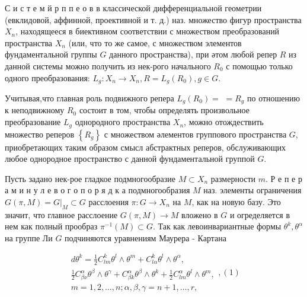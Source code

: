 \documentclass[10pt]{article}
\begin{document}
С и с т е м й р п п е о в в классической дифференциальной геометрии (евклидовой, аффинной, проективной и т. д.) наз. множество фигур пространства $X_{n}$, находящееся в биективном соответствии с множеством преобразований пространства $X_{n}$ (или, что то же самое, с множеством элементов фундаментальной группы $G$ данного пространства), при әтом любой репер $R$ из данной системы можно получить из нек-рого начального $R_{0}$ с помощью только одного преобразования: $L_{g}: X_{n} \rightarrow X_{n}, R=L_{g}\left(R_{0}\right), g \in G$.



Учитывая,что главная роль подвижного репера $L_{g}\left(R_{0}\right)=$ $=R_{g}$ по отношению к неподвижному $R_{0}$ состоит в том, чтобы определять произвольное преобразование $L_{g}$ однородного пространства $X_{n}$, можно отождествить множество реперов $\left\{R_{g}\right\}$ с множеством әлементов группового пространства $G$, приобретающих таким образом смысл абстрактных реперов, обслуживающих любое однородное пространство с данной фундаментальной группой $G$.



Пусть задано нек-рое гладкое подмногообразие $M \subset X_{n}$ размерности $m$. Р е п е р а м и н у л е в о г о п о р я д к а подмногообразия $M$ наз. элементы ограничения $G(\pi, M)=\left.G\right|_{M} \subset G$ расслоения $\pi: G \rightarrow X_{n}$ на $M$, как на новую базу. Это значит, что главное расслоение $G(\pi, M) \rightarrow M$ вложено в $G$ и огределяется в нем как полный прообраз $\pi^{-1}(M) \subset G$. Так как левоинвариантные формы $\theta^{k}, \theta^{\alpha}$ на группе Ли $G$ подчиняются уравнениям Маурера - Картана



\[

\begin{gathered}

d \theta^{k}=\frac{1}{2} C_{l m}^{k} \theta^{l} \wedge \theta^{m}+C_{l \alpha}^{k} \theta^{l} \wedge \theta^{\alpha}, \\

\frac{1}{2} C_{\beta \nu}^{\alpha} \theta^{\beta} \wedge \theta^{\gamma}+C_{\beta k}^{\alpha} \theta^{\beta} \wedge \theta^{k}+\frac{1}{2} C_{l m}^{\alpha} \theta^{l} \wedge \theta^{m}, \\

m=1,2, \ldots, n ; \alpha, \beta, \gamma=n+1, \ldots, r,

\end{gathered},(1)

\]
\end{document}
